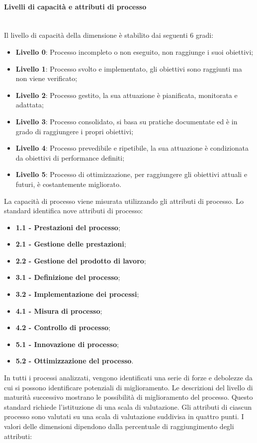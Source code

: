 \paragraph {Livelli di capacità e attributi di processo}\mbox{}\\
Il livello di capacità della dimensione è stabilito dai seguenti 6 gradi:
\begin{itemize}
	\item \textbf{Livello 0}: Processo incompleto o non eseguito,  non raggiunge i suoi obiettivi;
	\item \textbf{Livello 1}: Processo svolto e implementato, gli obiettivi sono raggiunti ma non viene verificato;
	\item \textbf{Livello 2}: Processo gestito, la sua attuazione è pianificata, monitorata e adattata;
	\item \textbf{Livello 3}: Processo consolidato, si basa su pratiche documentate ed è in grado di raggiungere i propri obiettivi;
	\item \textbf{Livello 4}: Processo prevedibile e ripetibile, la sua attuazione è condizionata da obiettivi di performance definiti;
	\item \textbf{Livello 5}: Processo di ottimizzazione, per raggiungere gli obiettivi attuali e futuri, è costantemente migliorato.
\end{itemize}
La capacità di processo viene misurata utilizzando gli attributi di processo. Lo standard identifica nove attributi di processo:
\begin{itemize}
	\item \textbf{1.1 - Prestazioni del processo};
	\item \textbf{2.1 - Gestione delle prestazioni};
	\item \textbf{2.2 - Gestione del prodotto di lavoro};
	\item \textbf{3.1 - Definizione del processo};
	\item \textbf{3.2 - Implementazione dei processi};
	\item \textbf{4.1 - Misura di processo};
	\item \textbf{4.2 - Controllo di processo};
	\item \textbf{5.1 - Innovazione di processo};
	\item \textbf{5.2 - Ottimizzazione del processo}.
\end{itemize}
In tutti i processi analizzati, vengono identificati una serie di forze e debolezze da cui si possono identificare potenziali di miglioramento. Le descrizioni del livello di maturità successivo mostrano le possibilità di miglioramento del processo. Questo standard richiede l'istituzione di una scala di valutazione. Gli attributi di ciascun processo sono valutati su una scala di valutazione suddivisa in quattro punti. I valori delle dimensioni dipendono dalla percentuale di raggiungimento degli attributi:
